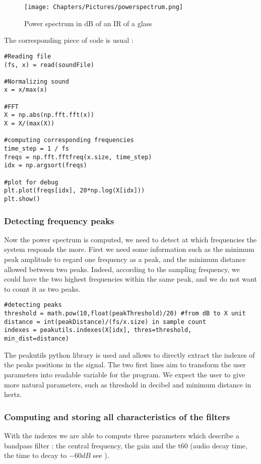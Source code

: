 \begin{figure}[h]
    \centering
    \texttt{[image: Chapters/Pictures/powerspectrum.png]}
    \caption{Power spectrum in dB of an IR of a glass}
    \label{fig:powerspectrum}
\end{figure}

The corresponding piece of code is usual :

\begin{lstlisting}
#Reading file
(fs, x) = read(soundFile)

#Normalizing sound
x = x/max(x)

#FFT
X = np.abs(np.fft.fft(x))
X = X/(max(X))

#computing corresponding frequencies
time_step = 1 / fs
freqs = np.fft.fftfreq(x.size, time_step) 
idx = np.argsort(freqs)

#plot for debug
plt.plot(freqs[idx], 20*np.log(X[idx]))
plt.show()
\end{lstlisting}

\subsubsection*{Detecting frequency peaks}
Now the power spectrum is computed, we need to detect at which frequencies the system responds the more. First we need some information such as the minimum peak amplitude to regard one frequency as a peak, and the minimum distance allowed between two peaks. Indeed, according to the sampling frequency, we could have the two highest frequencies within the same peak, and we do not want to count it as two peaks.

\begin{lstlisting}
#detecting peaks
threshold = math.pow(10,float(peakThreshold)/20) #from dB to X unit
distance = int(peakDistance)/(fs/x.size) in sample count
indexes = peakutils.indexes(X[idx], thres=threshold, min_dist=distance)
\end{lstlisting}

The peakutils python library is used and allows to directly extract the indexes of the peaks positions in the signal. The two first lines aim to transform the user parameters into readable variable for the program. We expect the user to give more natural parameters, such as threshold in decibel and minimum distance in hertz.

\subsubsection*{Computing and storing all characteristics of the filters}
With the indexes we are able to compute three parameters which describe a bandpass filter : the central frequency, the gain and the t60 (audio decay time, the time to decay to $-60 dB$ see \cite{jost60}).

